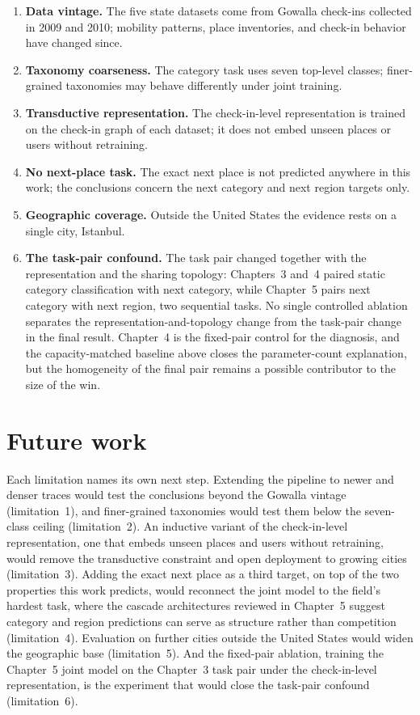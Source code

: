 \begin{enumerate}
  \item \textbf{Data vintage.} The five state datasets come from Gowalla check-ins
        collected in 2009 and 2010; mobility patterns, place inventories, and
        check-in behavior have changed since.
  \item \textbf{Taxonomy coarseness.} The category task uses seven top-level classes;
        finer-grained taxonomies may behave differently under joint training.
  \item \textbf{Transductive representation.} The check-in-level representation is
        trained on the check-in graph of each dataset; it does not embed unseen
        places or users without retraining.
  \item \textbf{No next-place task.} The exact next place is not predicted anywhere
        in this work; the conclusions concern the next category and next region
        targets only.
  \item \textbf{Geographic coverage.} Outside the United States the evidence rests on
        a single city, Istanbul.
  \item \textbf{The task-pair confound.} The task pair changed together with the
        representation and the sharing topology: Chapters~3 and~4 paired static
        category classification with next category, while Chapter~5 pairs next
        category with next region, two sequential tasks. No single controlled
        ablation separates the representation-and-topology change from the
        task-pair change in the final result. Chapter~4 is the fixed-pair control
        for the diagnosis, and the capacity-matched baseline above closes the
        parameter-count explanation, but the homogeneity of the final pair remains a
        possible contributor to the size of the win.
\end{enumerate}

\section{Future work}
\label{sec:conc:future}

Each limitation names its own next step. Extending the pipeline to newer and denser
traces would test the conclusions beyond the Gowalla vintage (limitation~1), and
finer-grained taxonomies would test them below the seven-class ceiling
(limitation~2). An inductive variant of the check-in-level representation, one that
embeds unseen places and users without retraining, would remove the transductive
constraint and open deployment to growing cities (limitation~3). Adding the exact
next place as a third target, on top of the two properties this work predicts, would
reconnect the joint model to the field's hardest task, where the cascade
architectures reviewed in Chapter~5 suggest category and region predictions can serve
as structure rather than competition (limitation~4). Evaluation on further cities
outside the United States would widen the geographic base (limitation~5). And the
fixed-pair ablation, training the Chapter~5 joint model on the Chapter~3 task pair
under the check-in-level representation, is the experiment that would close the
task-pair confound (limitation~6).

